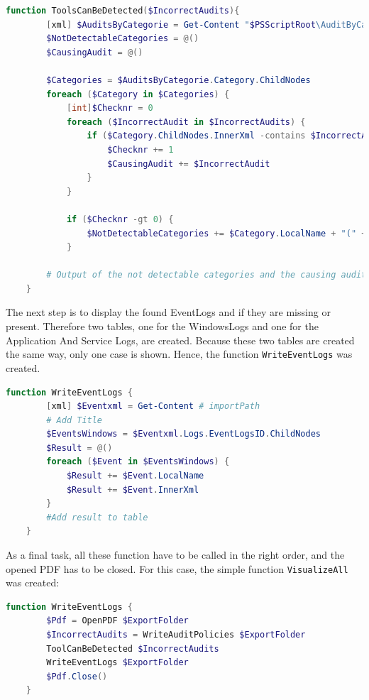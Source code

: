 \begin{lstlisting}[caption=Function ToolsCanBeDetected, language=PowerShell]
    function ToolsCanBeDetected($IncorrectAudits){
        [xml] $AuditsByCategorie = Get-Content "$PSScriptRoot\AuditByCategorie.xml"
        $NotDetectableCategories = @()
        $CausingAudit = @()

        $Categories = $AuditsByCategorie.Category.ChildNodes
        foreach ($Category in $Categories) {
            [int]$Checknr = 0
            foreach ($IncorrectAudit in $IncorrectAudits) {
                if ($Category.ChildNodes.InnerXml -contains $IncorrectAudit) {
                    $Checknr += 1
                    $CausingAudit += $IncorrectAudit
                }
            }
        
            if ($Checknr -gt 0) {
                $NotDetectableCategories += $Category.LocalName + "(" + $CausingAudit + ")"
            }

        # Output of the not detectable categories and the causing audits    
    }
\end{lstlisting}
The next step is to display the found EventLogs and if they are missing or present. Therefore two tables, one for the WindowsLogs and one for the Application And Service Logs, are created. Because these two tables are created the same way, only one case is shown. Hence, the function \lstinline|WriteEventLogs| was created.
\begin{lstlisting}[caption=Function ToolsCanBeDetected, language=PowerShell]
    function WriteEventLogs { 
        [xml] $Eventxml = Get-Content # importPath
        # Add Title
        $EventsWindows = $Eventxml.Logs.EventLogsID.ChildNodes
        $Result = @()
        foreach ($Event in $EventsWindows) {
            $Result += $Event.LocalName
            $Result += $Event.InnerXml
        }
        #Add result to table
    }
\end{lstlisting}
As a final task, all these function have to be called in the right order, and the opened PDF has to be closed. For this case, the simple function \lstinline|VisualizeAll| was created:
\begin{lstlisting}[caption=Function VisualizeAll, language=PowerShell]
    function WriteEventLogs { 
        $Pdf = OpenPDF $ExportFolder
        $IncorrectAudits = WriteAuditPolicies $ExportFolder
        ToolCanBeDetected $IncorrectAudits
        WriteEventLogs $ExportFolder
        $Pdf.Close()
    }
\end{lstlisting}

